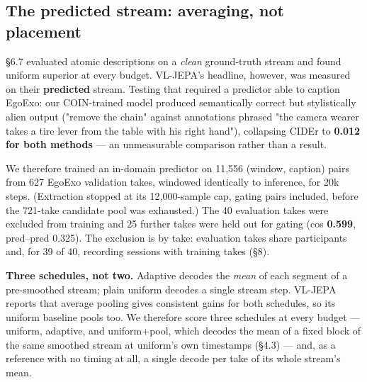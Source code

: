 \medskip

\subsection{The predicted stream: averaging, not placement}

\S6.7 evaluated atomic descriptions on a \emph{clean} ground-truth stream and found uniform superior at every budget. VL-JEPA's headline, however, was measured on their \textbf{predicted} stream. Testing that required a predictor able to caption EgoExo: our COIN-trained model produced semantically correct but stylistically alien output ("remove the chain" against annotations phrased "the camera wearer takes a tire lever from the table with his right hand"), collapsing CIDEr to \textbf{0.012 for both methods} --- an unmeasurable comparison rather than a result.

We therefore trained an in-domain predictor on 11,556 (window, caption) pairs from 627 EgoExo validation takes, windowed identically to inference, for 20k steps. (Extraction stopped at its 12,000-sample cap, gating pairs included, before the 721-take candidate pool was exhausted.) The 40 evaluation takes were excluded from training and 25 further takes were held out for gating (cos \textbf{0.599}, pred--pred 0.325). The exclusion is by take: evaluation takes share participants and, for 39 of 40, recording sessions with training takes (\S8).

\textbf{Three schedules, not two.} Adaptive decodes the \emph{mean} of each segment of a pre-smoothed stream; plain uniform decodes a single stream step. VL-JEPA reports that average pooling gives consistent gains for both schedules, so its uniform baseline pools too. We therefore score three schedules at every budget --- uniform, adaptive, and uniform+pool, which decodes the mean of a fixed block of the same smoothed stream at uniform's own timestamps (\S4.3) --- and, as a reference with no timing at all, a single decode per take of its whole stream's mean.

